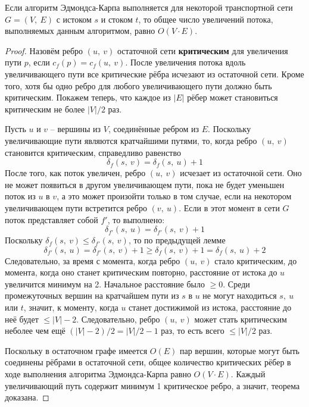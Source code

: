 \documentclass[a4paper,12pt]{article}
\begin{document}
\begin{theorem}
Если алгоритм Эдмондса-Карпа выполняется для некоторой транспортной сети $G = (V,\ E)$ с истоком $s$ и стоком $t$, то общее число увеличений потока, выполняемых данным алгоритмом, равно $O(V \cdot E)$.
\end{theorem}
\begin{proof}
Назовём ребро $(u,\ v)$ остаточной сети \textbf{критическим} для увеличения пути $p$, если $c_f(p) = c_f(u,\ v)$. После увеличения потока вдоль увеличивающего пути все критические рёбра исчезают из остаточной сети. Кроме того, хотя бы одно ребро для любого увеличивающего пути должно быть критическим. Покажем теперь, что каждое из $|E|$ рёбер может становиться критическим не более $|V|\slash2$ раз.

Пусть $u$ и $v$ -- вершины из $V$, соединённые ребром из $E$. Поскольку увеличивающие пути являются кратчайшими путями, то, когда ребро $(u,\ v)$ становится критическим, справедливо равенство \[\delta_{f}(s,\ v) = \delta_{f}(s,\ u) + 1\]
После того, как поток увеличен, ребро $(u,\ v)$ исчезает из остаточной сети. Оно не может появиться в другом увеличивающем пути, пока не будет уменьшен поток из $u$ в $v$, а это может произойти только в том случае, если на некотором увеличивающем пути встретится ребро $(v,\ u)$. Если в этот момент в сети $G$ поток представляет собой $f'$, то выполнено: \[\delta_{f'}(s,\ u) = \delta_{f'}(s,\ v) + 1\]
Поскольку $\delta_{f}(s,\ v) \leqslant \delta_{f'}(s,\ v)$, то по предыдущей лемме \[\delta_{f'}(s,\ u) = \delta_{f'}(s,\ v) + 1 \geqslant \delta_{f}(s,\ v) + 1 = \delta_{f}(s,\ u) + 2\]
Следовательно, за время с момента, когда ребро $(u,\ v)$ стало критическим, до момента, когда оно станет критическим повторно, расстояние от истока до $u$ увеличится минимум на 2. Начальное расстояние было $\geqslant 0$. Среди промежуточных вершин на кратчайшем пути из $s$ в $u$ не могут находиться $s,\ u$ или $t$, значит, к моменту, когда $u$ станет достижимой из истока, расстояние до неё будет $\leqslant |V| - 2$. Следовательно, ребро $(u,\ v)$ может стать критическим неболее чем ещё $(|V| - 2)\slash2 = |V|\slash2 - 1$ раз, то есть всего $\leqslant |V| \slash 2$ раз.

Поскольку в остаточном графе имеется $O(E)$ пар вершин, которые могут быть соединены рёбрами в остаточной сети, общее количество критических рёбер в ходе выполнения алгоритма Эдмондса-Карпа равно $O(V \cdot E)$. Каждый увеличивающий путь содержит минимум 1 критическое ребро, а значит, теорема доказана.

\end{proof}
\end{document}
